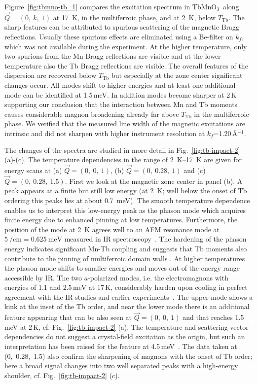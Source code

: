 \documentclass[aps,prb,twocolumn,superscriptaddress,showpacs,floatfix]{revtex4-2}
\newcommand{\tbmno}{TbMnO$_3$}
\begin{document}
Figure~\ref{fig:tbmno-tb_1} compares the excitation spectrum in \tbmno\ along $\vec{Q}=(0,~k,~1)$ at \SI{17}{\kelvin}, in the multiferroic phase, and at \SI{2}{\kelvin}, below $T_{\textrm{Tb}}$. The sharp features can be attributed to spurious scattering of the magnetic Bragg reflections. Usually these spurious effects are eliminated using a Be-filter on $k_f$, which was not available during the experiment. At the higher temperature, only two spurions from the Mn Bragg reflections are visible and at the lower temperature also the Tb Bragg reflections are visible. The overall features of the dispersion are recovered below $T_{\textrm{Tb}}$ but especially at the zone center significant changes occur. All modes shift to higher energies and at least one additional mode can be identified at 1.5\,meV. 
In addition modes become sharper at 2\,K supporting our conclusion that the interaction between Mn and Tb moments causes considerable magnon broadening already far above $T_{\textrm{Tb}}$ in the multiferroic phase.
We verified that the measured line width of the magnetic excitations are intrinsic and did not sharpen with higher instrument resolution at $k_f$=1.20\,\AA$^{-1}$.

The changes of the spectra are studied in more detail in Fig.~\ref{fig:tb-impact-2} (a)-(c).
The temperature dependencies in the range of \SIrange{2}{17}{\kelvin} are given for energy scans at (a) $\vec{Q}=(0,~0,~1)$, (b) $\vec{Q}=(0,~0.28,~1)$ and (c) $\vec{Q}=(0,~0.28,~1.5)$. First we look at the magnetic zone center in panel (b).
A peak appears at a finite but still low energy (at \SI{2}{\kelvin}; well below the onset of Tb ordering this peaks lies at about \SI{0.7}{\meV}). The smooth temperature dependence enables us to interpret this low-energy peak as the phason mode which acquires finite energy due to enhanced pinning at low temperatures. Furthermore, the position of the mode at \SI{2}{\kelvin} agrees well to an AFM resonance mode at $\SI{5}{\per\cm}=\SI{0.625}{\meV}$ measured in IR spectroscopy~\cite{Pimenov2009,Shuvaev2011}.
The hardening of the phason energy indicates significant Mn-Tb coupling and suggests that Tb moments also contribute to the pinning of multiferroic domain walls \cite{Stein2021}.
At higher temperatures the phason mode shifts to smaller energies and moves out of the energy range accessible by IR. The two $a$-polarized modes, i.e. the electromagnons with energies of 1.1 and 2.5\,meV at 17\,K, considerably harden upon cooling in perfect agreement with the IR studies and earlier experiments~\cite{Pimenov2009,Shuvaev2011,Holbein2015}.
The upper mode shows a kink at the inset of the Tb order, and near the lower mode there is an additional feature appearing that can be also seen at $\vec{Q}=(0,~0,~1)$ and that reaches 1.5\,meV at 2\,K, cf. Fig.~\ref{fig:tb-impact-2} (a). The temperature and scattering-vector dependencies do not
suggest a crystal-field excitation as the origin, but such an interpretation has been raised for the
feature at 4.5\,meV~\cite{Senff2007,Kajimoto2005}.
The data taken at (0,~0.28,~1.5) also confirm the sharpening of magnons with the onset of Tb order; here a broad signal changes into two well separated peaks with a high-energy shoulder, cf. Fig.~\ref{fig:tb-impact-2} (c).
\end{document}
